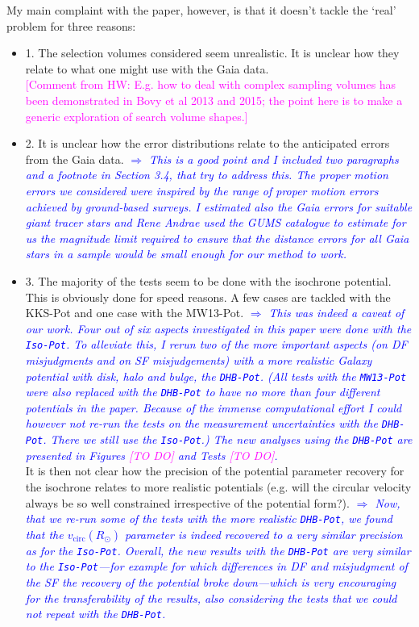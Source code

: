 \documentclass[10pt,a4paper]{article}
\newcommand{\Wilma}[1]{\textcolor{Magenta}{#1}}
\newcommand{\Comment}[1]{\textsl{\textcolor{Blue}{$\Longrightarrow$ {#1}}}}
\begin{document}
My main complaint with the paper, however, is that it doesn't tackle the `real'
problem for three reasons:
\begin{itemize}
\item 1. The selection volumes considered seem unrealistic. It is unclear how they relate to what one might use with the Gaia data.\\
\Wilma{[Comment from HW: E.g. how to deal with complex sampling volumes has been demonstrated in Bovy et al 2013 and 2015; the point here is to make a generic exploration of search volume shapes.]}
\item 2. It is unclear how the error distributions relate to the anticipated errors from the Gaia data. \Comment{This is a good point and I included two paragraphs and a footnote in Section 3.4, that try to address this. The proper motion errors we considered were inspired by the range of proper motion errors achieved by ground-based surveys. I estimated also the Gaia errors for suitable giant tracer stars and Rene Andrae used the GUMS catalogue to estimate for us the magnitude limit required to ensure that the distance errors for all Gaia stars in a sample would be small enough for our method to work.}
\item 3. The majority of the tests seem to be done with the isochrone potential. This is obviously done for speed reasons. A few cases are tackled with the KKS-Pot and one
case with the MW13-Pot. \Comment{This was indeed a caveat of our work. Four out of six aspects investigated in this paper were done with the \texttt{Iso-Pot}. To alleviate this, I rerun two of the more important aspects (on DF misjudgments and on SF misjudgements) with a more realistic Galaxy potential with disk, halo and bulge, the \texttt{DHB-Pot}. (All tests with the \texttt{MW13-Pot} were also replaced with the \texttt{DHB-Pot} to have no more than four different potentials in the paper. Because of the immense computational effort I could however not re-run the tests on the measurement uncertainties with the \texttt{DHB-Pot}. There we still use the \texttt{Iso-Pot}.) The new analyses using the \texttt{DHB-Pot} are presented in Figures \Wilma{[TO DO]} and Tests \Wilma{[TO DO]}.} \\
It is then not clear how the precision of the potential parameter recovery for the isochrone relates to more realistic potentials (e.g. will the circular velocity always be so well constrained irrespective of the potential form?). \Comment{Now, that we re-run some of the tests with the more realistic \texttt{DHB-Pot}, we found that the $v_\text{circ}(R_\odot)$ parameter is indeed recovered to a very similar precision as for the \texttt{Iso-Pot}. Overall, the new results with the \texttt{DHB-Pot} are very similar to the \texttt{Iso-Pot}---for example for which differences in DF and misjudgment of the SF the recovery of the potential broke down---which is very encouraging for the transferability of the results, also considering the tests that we could not repeat with the \texttt{DHB-Pot}.}\\

\end{itemize}
\end{document}
